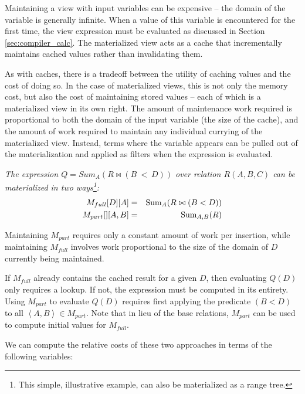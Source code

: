 Maintaining a view with input variables can be expensive -- the domain of the variable is generally infinite.  When a value of this variable is encountered for the first time, the view expression must be evaluated as discussed in Section \ref{sec:compiler_calc}.  The materialized view acts as a cache that incrementally maintains cached values rather than invalidating them.

As with caches, there is a tradeoff between the utility of caching values and the cost of doing so.  In the case of materialized views, this is not only the memory cost, but also the cost of maintaining stored values -- each of which is a materialized view in its own right.  The amount of maintenance work required is proportional to both the domain of the input variable (the size of the cache), and the amount of work required to maintain any individual currying of the materialized view.  Instead, terms where the variable appears can be pulled out of the materialization and applied as filters when the expression is evaluated.

\begin{example} \em
The expression $Q = Sum_A(R \bowtie (B~<~D))$ over relation $R(A,B,C)$ can be materialized in two ways\footnote{This simple, illustrative example, can also be materialized as a range tree.}:
{\small \begin{eqnarray*}
M_{full}[D][A] & = & \mbox{Sum}_A(R \bowtie (B < D)) \\
M_{part}[][A,B] & = & \mbox{Sum}_{A,B}(R)
\end{eqnarray*}}
\end{example}

Maintaining $M_{part}$ requires only a constant amount of work per insertion, while maintaining $M_{full}$ involves work proportional to the size of the domain of $D$ currently being maintained.  

  If $M_{full}$ already contains the cached result for a given $D$, then evaluating $Q(D)$ only requires a lookup.  If not, the expression must be computed in its entirety.  Using $M_{part}$ to evaluate $Q(D)$ requires first applying the predicate $(B < D)$ to all $\left<A,B\right> \in M_{part}$.  Note that in lieu of the base relations, $M_{part}$ can be used to compute initial values for $M_{full}$.

We can compute the relative costs of these two approaches in terms of the following variables:

